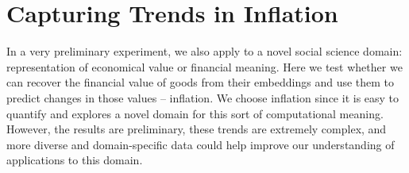 
\section{Capturing Trends in Inflation}
\label{sec:finance_experiment}

In a very preliminary experiment, we also apply {\wc} to a novel social science domain:  representation of economical value or financial meaning. Here we test whether we can recover the financial value of goods from their embeddings and use them to predict changes in those values  -- inflation. We choose inflation since it is easy to quantify and explores a novel domain for this sort of computational meaning. However, the results are preliminary, these trends are extremely complex, and more diverse and domain-specific data could help improve our understanding of applications to this domain.    

